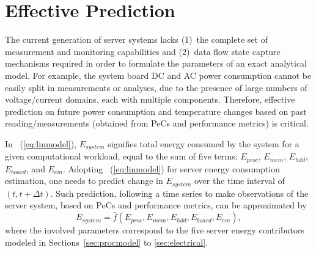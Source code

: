 % 
%
\chapter{Effective Prediction}
\label{chp:application}
The current generation of server systems lacks (1)~the complete set of
measurement and monitoring capabilities and (2)~data flow state capture
mechanisms required in order to formulate the parameters of an exact
analytical model.  For example, the system board DC and AC power
consumption cannot be easily split in measurements or analyses, due to
the presence of large numbers of voltage/current domains, each with
multiple components.  Therefore, effective prediction on future power
consumption and temperature changes based on past reading/measurements
(obtained from PeCs and performance metrics) is critical.

In \equationname~(\ref{eq:linmodel}), $E_{system }$ signifies total
energy consumed by the system for a given computational workload, equal
to the sum of five terms: $E_{proc}$, $E_{mem}$, $E_{hdd}$, $E_{board}$,
and $E_{em}$.  Adopting \equationname~(\ref{eq:linmodel}) for server
energy consumption estimation, one needs to predict change in
$E_{system}$ over the time interval of $(t, t+\Delta t)$.  Such
prediction, following a time series to make observations of the server
system, based on PeCs and performance metrics, can be approximated by
\begin{equation}
\label{eq:tseries}
E_{system} = \hat{f}(E_{proc}, E_{mem}, E_{hdd}, E_{board}, E_{em}),
\end{equation}
where the involved parameters correspond to the five server energy
contributors modeled in Sections~\ref{sec:procmodel} to \ref{sec:electrical}.
